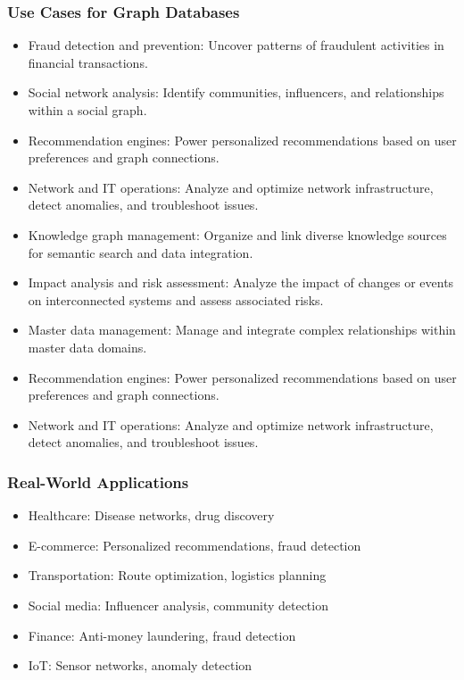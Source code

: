 \begin{frame}[fragile]\frametitle{Use Cases for Graph Databases}
  \begin{itemize}
    \item Fraud detection and prevention: Uncover patterns of fraudulent activities in financial transactions.
    \item Social network analysis: Identify communities, influencers, and relationships within a social graph.
    \item Recommendation engines: Power personalized recommendations based on user preferences and graph connections.
    \item Network and IT operations: Analyze and optimize network infrastructure, detect anomalies, and troubleshoot issues.
    \item Knowledge graph management: Organize and link diverse knowledge sources for semantic search and data integration.
	\item Impact analysis and risk assessment: Analyze the impact of changes or events on interconnected systems and assess associated risks.
	\item Master data management: Manage and integrate complex relationships within master data domains.
	\item Recommendation engines: Power personalized recommendations based on user preferences and graph connections.
	\item Network and IT operations: Analyze and optimize network infrastructure, detect anomalies, and troubleshoot issues.
\end{itemize}
	\end{frame}
	
\begin{frame}[fragile]\frametitle{Real-World Applications}
  \begin{itemize}
    \item Healthcare: Disease networks, drug discovery
    \item E-commerce: Personalized recommendations, fraud detection
    \item Transportation: Route optimization, logistics planning
    \item Social media: Influencer analysis, community detection
    \item Finance: Anti-money laundering, fraud detection
    \item IoT: Sensor networks, anomaly detection
  \end{itemize}
\end{frame}


